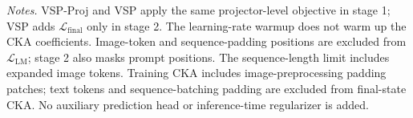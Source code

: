 \begin{table}[t]
\begin{tabularx}{\textwidth}{
        @{}
        >{\raggedright\arraybackslash}p{}
        >{\raggedright\arraybackslash}X
        >{\raggedright\arraybackslash}X
        @{}
    }
        \bottomrule
    \end{tabularx}

    \vspace{3pt}
    \begin{minipage}{\textwidth}
        \footnotesize
        \textit{Notes.}
        VSP-Proj and VSP apply the same projector-level objective in stage 1;
        VSP adds $\mathcal L_{\mathrm{final}}$ only in stage 2.
        The learning-rate warmup does not warm up the CKA coefficients.
        Image-token and sequence-padding positions are excluded from
        $\mathcal L_{\mathrm{LM}}$; stage 2 also masks prompt positions.
        The sequence-length limit includes expanded image tokens.
        Training CKA includes image-preprocessing padding patches;
        text tokens and sequence-batching padding are excluded from final-state CKA.
        No auxiliary prediction head or inference-time regularizer is added.
    \end{minipage}
\end{table}
